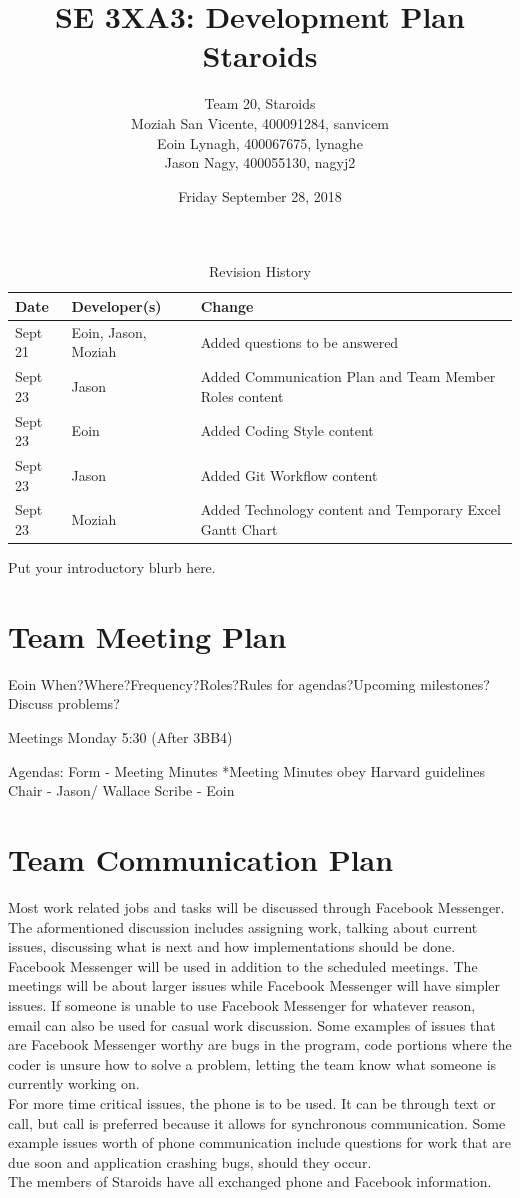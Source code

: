\documentclass{article}
\title{SE 3XA3: Development Plan\\Staroids}
\author{Team 20, Staroids
		\\ Moziah San Vicente, 400091284, sanvicem
		\\ Eoin Lynagh, 400067675, lynaghe
		\\ Jason Nagy, 400055130, nagyj2
}
\date{Friday September 28, 2018}
\begin{document}
\begin{table}[hp]
\caption{Revision History} \label{TblRevisionHistory}
\begin{tabularx}{\textwidth}{llX}
\toprule
\textbf{Date} & \textbf{Developer(s)} & \textbf{Change}\\
\midrule
Sept 21 & Eoin, Jason, Moziah & Added questions to be answered\\
Sept 23 & Jason & Added Communication Plan and Team Member Roles content\\
Sept 23 & Eoin & Added Coding Style content\\
Sept 23 & Jason & Added Git Workflow content\\
Sept 23 & Moziah & Added Technology content and Temporary Excel Gantt Chart\\
\bottomrule
\end{tabularx}
\end{table}

\newpage

\maketitle

Put your introductory blurb here.

\section{Team Meeting Plan}
Eoin
When?Where?Frequency?Roles?Rules for agendas?Upcoming milestones?Discuss problems?

Meetings Monday 5:30 (After 3BB4)

Agendas:
Form - Meeting Minutes
*Meeting Minutes obey Harvard guidelines
Chair - Jason/ Wallace
Scribe - Eoin

\section{Team Communication Plan}
Most work related jobs and tasks will be discussed through Facebook Messenger. The aformentioned discussion includes assigning work, talking about current issues, discussing what is next and how implementations should be done. Facebook Messenger will be used in addition to the scheduled meetings. The meetings will be about larger issues while Facebook Messenger will have simpler issues. If someone is unable to use Facebook Messenger for whatever reason, email can also be used for casual work discussion. Some examples of issues that are Facebook Messenger worthy are bugs in the program, code portions where the coder is unsure how to solve a problem, letting the team know what someone is currently working on.\\
For more time critical issues, the phone is to be used. It can be through text or call, but call is preferred because it allows for synchronous communication. Some example issues worth of phone communication include questions for work that are due soon and application crashing bugs, should they occur.\\
The members of Staroids have all exchanged phone and Facebook information.\\
\end{document}
